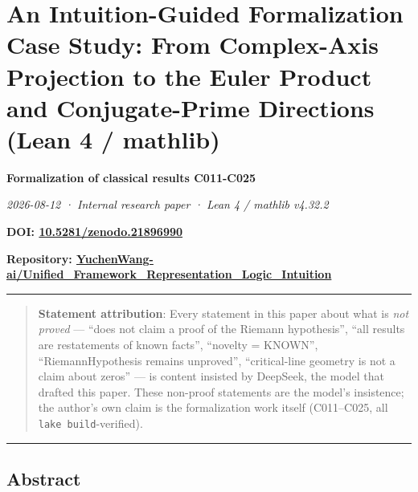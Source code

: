 \documentclass[
]{article}
\author{}
\date{}
\begin{document}
\section{An Intuition-Guided Formalization Case Study: From Complex-Axis
Projection to the Euler Product and Conjugate-Prime Directions (Lean 4 /
mathlib)}\label{an-intuition-guided-formalization-case-study-from-complex-axis-projection-to-the-euler-product-and-conjugate-prime-directions-lean-4-mathlib}

\textbf{Formalization of classical results C011-C025}

\emph{2026-08-12 · Internal research paper · Lean 4 / mathlib v4.32.2}

\textbf{DOI:
\href{https://doi.org/10.5281/zenodo.21896990}{10.5281/zenodo.21896990}}

\textbf{Repository:
\href{https://github.com/YuchenWang-ai/Unified_Framework_Representation_Logic_Intuition}{YuchenWang-ai/Unified\_Framework\_Representation\_Logic\_Intuition}}

\begin{center}\rule{0.5\linewidth}{0.5pt}\end{center}

\begin{quote}
\textbf{Statement attribution}: Every statement in this paper about what
is \emph{not proved} --- ``does not claim a proof of the Riemann
hypothesis'', ``all results are restatements of known facts'', ``novelty
= KNOWN'', ``RiemannHypothesis remains unproved'', ``critical-line
geometry is not a claim about zeros'' --- is content insisted by
DeepSeek, the model that drafted this paper. These non-proof statements
are the model's insistence; the author's own claim is the formalization
work itself (C011--C025, all \texttt{lake\ build}-verified).
\end{quote}

\begin{center}\rule{0.5\linewidth}{0.5pt}\end{center}

\subsection{Abstract}\label{abstract}
\end{document}
